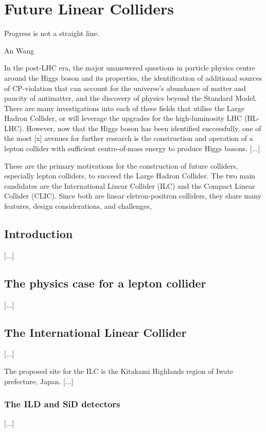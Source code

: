 \chapter{Future Linear Colliders}

\epigraph{Progress is not a straight line.}{An Wang}

In the post-LHC era, the major unanswered questions in particle physics centre around the Higgs boson and its properties, the identification of additional sources of CP-violation that can account for the universe's abundance of matter and paucity of antimatter, and the discovery of physics beyond the Standard Model. There are many investigations into each of these fields that utilise the Large Hadron Collider, or will leverage the upgrades for the high-luminosity LHC (HL-LHC). However, now that the Higgs boson has been identified successfully, one of the most [x] avenues for further research is the construction and operation of a lepton collider with sufficient centre-of-mass energy to produce Higgs bosons. [...]

These are the primary motivations for the construction of future colliders, especially lepton colliders, to succeed the Large Hadron Collider. The two main candidates are the International Linear Collider (ILC) and  the Compact Linear Collider (CLIC). Since both are linear eletron-positron colliders, they share many features, design considerations, and challenges, 

\section{Introduction}
[...]

\section{The physics case for a lepton collider}
[...]

\section{The International Linear Collider}
[...]

The proposed site for the ILC is the Kitakami Highlands region of Iwate prefecture, Japan. [...]

\subsection{The ILD and SiD detectors}
[...]

